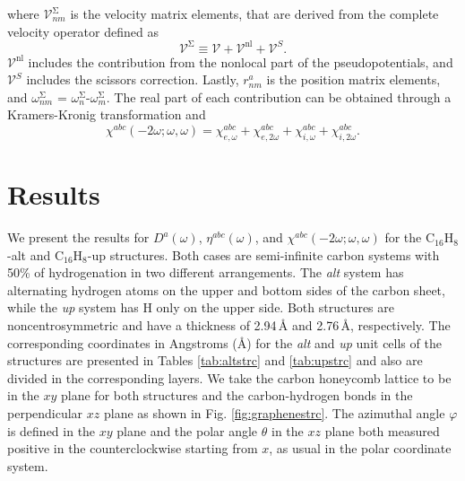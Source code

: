 \documentclass[pss]{wiley2sp} %
\begin{document}
where $\mathcal{V}^{\mathrm{\Sigma}}_{nm}$ is the velocity matrix elements,
that are derived from the complete velocity operator defined as
\begin{equation*}\label{eq:nonlocal}
\boldsymbol{\mathcal{V}}^{\mathrm{\Sigma}}\equiv
\boldsymbol{\mathcal{V}}+
\boldsymbol{\mathcal{V}}^{\mathrm{nl}}+
\boldsymbol{\mathcal{V}}^{S}.
\end{equation*}
$\boldsymbol{\mathcal{V}}^{\mathrm{nl}}$ includes the contribution from the
nonlocal part of the pseudopotentials, and $\boldsymbol{\mathcal{V}}^{S}$
includes the scissors correction. Lastly, $r^{a}_{nm}$ is the position matrix
elements, and $\omega^\mathrm{\Sigma}_{nm}$ =
$\omega^{\mathrm{\Sigma}}_{n}$-$\omega^{\mathrm{\Sigma}}_{m}$. The real part
of each contribution can be obtained through a Kramers-Kronig transformation
\cite{tancognePRB14} and
\begin{equation}\label{eq:chitotal}
\chi^{abc} (-2\omega;\omega,\omega) =
\chi^{abc}_{e,\omega} + \chi^{abc}_{e,2\omega} +
\chi^{abc}_{i,\omega} + \chi^{abc}_{i,2\omega}.
\end{equation}

\section{Results}\label{sec:results}

We present the results for {$D^{a}(\omega)$}, {$\eta^{abc}(\omega)$}, and
$\chi^{abc}(-2\omega;\omega,\omega)$ for the C$_{16}$H$_{8}$-alt and
C$_{16}$H$_{8}$-up structures. Both cases are semi-infinite carbon systems with
50\% of hydrogenation in two different arrangements. The \emph{alt} system has
alternating hydrogen atoms on the upper and bottom sides of the carbon sheet,
while the \emph{up} system has H only on the upper side. Both structures are
noncentrosymmetric and have a thickness of 2.94\,{\AA} and 2.76\,{\AA},
respectively. The corresponding coordinates in Angstroms (\AA) for the
\emph{alt} and \emph{up} unit cells of the structures are presented in Tables
\ref{tab:altstrc} and \ref{tab:upstrc} and also are divided in the corresponding
layers. We take the carbon honeycomb lattice to be in the $xy$ plane for both 
structures and the carbon-hydrogen bonds in the perpendicular $xz$ plane as shown in Fig.
\ref{fig:graphenestrc}. The azimuthal angle $\varphi$ is defined in the $xy$
plane and the polar angle $\theta$ in the $xz$ plane both measured positive in
the counterclockwise starting from $x$, as usual in the polar coordinate system.
\end{document}
